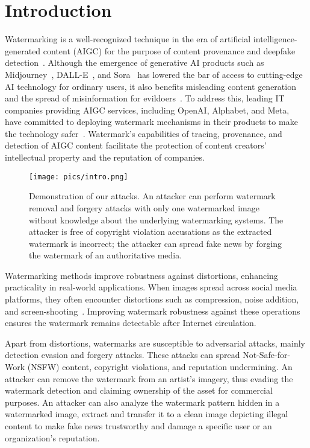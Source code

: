 \section{Introduction}
Watermarking is a well-recognized technique in the era of artificial intelligence-generated content (AIGC) for the purpose of content provenance and deepfake detection~\cite{jiang2024watermark,jiang2023evading}. Although the emergence of generative AI products such as Midjourney~\cite{Midjourney}, DALL-E~\cite{DALLE3}, and Sora~\cite{Sora} has lowered the bar of access to cutting-edge AI technology for ordinary users, it also benefits misleading content generation and the spread of misinformation for evildoers~\cite{fakenews1}. To address this, leading IT companies providing AIGC services, including OpenAI, Alphabet, and Meta, have committed to deploying watermark mechanisms in their products to make the technology safer~\cite{Whitehouse}. Watermark's capabilities of tracing, provenance, and detection of AIGC content facilitate the protection of content creators' intellectual property and the reputation of companies.

\begin{figure}[!t]
    \centering
    \texttt{[image: pics/intro.png]} 
    
    \caption{Demonstration of our attacks. An attacker can perform watermark removal and forgery attacks with only one watermarked image without knowledge about the underlying watermarking systems. The attacker is free of copyright violation accusations as the extracted watermark is incorrect; the attacker can spread fake news by forging the watermark of an authoritative media.} 
    \label{fig:intro}
    \vspace{-1mm}
\end{figure}


Watermarking methods improve robustness against distortions, enhancing practicality in real-world applications. When images spread across social media platforms, they often encounter distortions such as compression, noise addition, and screen-shooting~\cite{PIMoG}. Improving watermark robustness against these operations ensures the watermark remains detectable after Internet circulation.

Apart from distortions, watermarks are susceptible to adversarial attacks, mainly detection evasion and forgery attacks. These attacks can spread Not-Safe-for-Work (NSFW) content, copyright violations, and reputation undermining. An attacker can remove the watermark from an artist's imagery, thus evading the watermark detection and claiming ownership of the asset for commercial purposes. An attacker can also analyze the watermark pattern hidden in a watermarked image, extract and transfer it to a clean image depicting illegal content to make fake news trustworthy and damage a specific user or an organization's reputation. 

